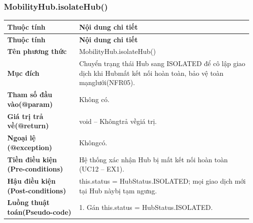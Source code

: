 \subsubsection{MobilityHub.isolateHub()}
\begin{longtable}{|L{0.24\textwidth}|L{0.70\textwidth}|}
\hline
\textbf{Thuộc tính} & \textbf{Nội dung chi tiết} \\
\hline
\endfirsthead
\hline
\textbf{Thuộc tính} & \textbf{Nội dung chi tiết} \\
\hline
\endhead
\textbf{Tên phương thức} & MobilityHub.isolateHub() \\
\hline
\textbf{Mục đích} & Chuyển trạng thái Hub sang ISOLATED để cô lập giao dịch khi Hub\newline mất kết nối hoàn toàn, bảo vệ toàn mạnglưới(NFR05). \\
\hline
\textbf{Tham số đầu vào}\newline \textbf{(@param)} & Không có. \\
\hline
\textbf{Giá trị trả về(@return)} & void – Khôngtrả vềgiá trị. \\
\hline
\textbf{Ngoại lệ (@exception)} & Khôngcó. \\
\hline
\textbf{Tiền điều kiện (Pre-}\newline \textbf{conditions)} & Hệ thống xác nhận Hub bị mất kết nối hoàn toàn (UC12 – EX1). \\
\hline
\textbf{Hậu điều kiện (Post-}\newline \textbf{conditions)} & this.status = HubStatus.ISOLATED; mọi giao dịch mới tại Hub này\newline bị tạm ngưng. \\
\hline
\textbf{Luồng thuật toán}\newline \textbf{(Pseudo-code)} & 1. Gán this.status = HubStatus.ISOLATED. \\
\hline
\end{longtable}
\vspace{-0.5\baselineskip}
